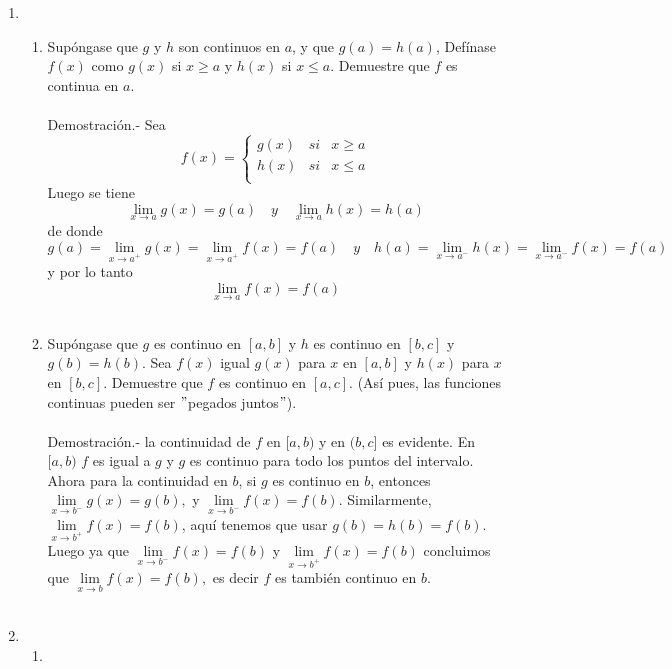 \begin{enumerate}
\item
\begin{enumerate}[\bfseries (a)]

    \item Supóngase que $g$ y $h$ son continuos en $a$, y que $g(a)=h(a)$, Defínase $f(x)$  como $g(x)$ si $x\geq a$ y $h(x)$ si $x\leq a$. Demuestre que $f$ es continua en $a$.\\\\
	Demostración.-\; Sea 
	$$f(x) = \left\{\begin{array}{rcl}
	    g(x)&si&x\geq a\\
	    h(x)&si&x\leq a\\
	\end{array}\right.$$
	Luego se tiene $$\lim\limits_{x\to a} g(x) = g(a)\quad  y \quad \lim\limits_{x\to a} h(x) = h(a)$$ de donde $$g(a) = \lim\limits_{x\to a^+} g(x) = \lim\limits_{x\to a^+} f(x) = f(a) \quad y \quad h(a) = \lim\limits_{x\to a^-} h(x) = \lim\limits_{x\to a^-} f(x) = f(a)$$
	y por lo tanto $$\lim\limits_{x\to a} f(x) = f(a)$$\\

    \item Supóngase que $g$ es continuo en $[a,b]$ y $h$ es continuo en $[b,c]$ y $g(b)=h(b)$. Sea $f(x)$ igual $g(x)$ para $x$ en $[a,b]$ y $h(x)$ para $x$ en $[b,c]$. Demuestre que $f$ es continuo en $[a,c]$. (Así pues, las funciones continuas pueden ser $"$pegados juntos$"$).\\\\
	Demostración.-\; la continuidad de $f$ en $[a,b)$ y en $(b,c]$ es evidente. En $[a,b)$ $f$ es igual a $g$ y $g$ es continuo para todo los puntos del intervalo.\\
	Ahora para la continuidad en $b$, si $g$ es continuo en $b$, entonces $\lim\limits_{x\to b^-} g(x) = g(b),$ y $\lim\limits_{x\to b^-} f(x) = f(b)$. Similarmente, $\lim\limits_{x\to b^+} f(x) = f(b)$, aquí tenemos que usar $g(b)=h(b)=f(b)$. Luego ya que $\lim\limits_{x\to b^-} f(x) = f(b)$ y $\lim\limits_{x\to b^+} f(x) = f(b)$ concluimos que $\lim\limits_{x\to b} f(x)=f(b),$ es decir $f$ es también continuo en $b$.\\\\

\end{enumerate}

\item 
\begin{enumerate}[\bfseries (a)]

	\item 

\end{enumerate}



\end{enumerate}

